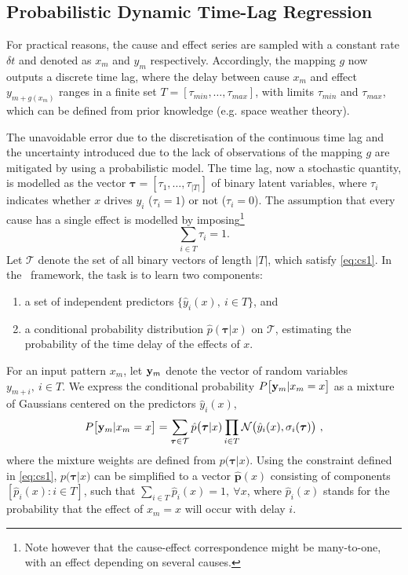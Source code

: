 \subsection{Probabilistic Dynamic Time-Lag Regression}

For practical reasons, the cause and effect series are sampled with a constant rate $\delta t$ and 
denoted as ${x_m}$ and ${y_m}$ respectively. Accordingly, the mapping $g$ now outputs a discrete 
time lag, where the delay between cause $x_m$ and effect $y_{m+g(x_m)}$ ranges in a finite set 
$T = [\tau_{min}, \ldots, \tau_{max}]$, with limits $\tau_{min}$ and  $\tau_{max}$, which can 
be defined from prior knowledge (e.g. space weather theory). 

The unavoidable error due to the discretisation of the continuous time lag and the uncertainty 
introduced due to the lack of observations of the mapping $g$ are mitigated by using a 
probabilistic model. The time lag, now a stochastic quantity, is modelled as the vector 
$\boldsymbol{\tau} = [\tau_1, \dots, \tau_{\rvert T \rvert}]$ of binary latent variables, 
where $\tau_i$ indicates whether $x$ drives $y_i$ ($\tau_i=1$) or not ($\tau_i=0$). The 
assumption that every cause has a single effect is modelled by imposing\footnote{Note however 
that the cause-effect correspondence might be many-to-one, with an effect depending on several 
causes.}
%
\begin{equation}\label{eq:cs1}
\sum_{i \in T} \tau_i = 1.
\end{equation}
%
Let $\mathcal{T}$ denote the set of all binary vectors of length $\rvert T \rvert$, which satisfy 
\cref{eq:cs1}. In the \XX \ framework, the task is to learn two components: 
\begin{enumerate}
  \item a set of independent predictors $\{\hat y_i(x),\ i \in T\}$, and
  \item a conditional probability distribution $\hat p(\boldsymbol{\tau} \rvert x)$ on 
        $\mathcal{T}$, estimating the probability of the time delay of the effects of $x$.
\end{enumerate} 
%
For an input pattern $x_m$, let ${\bf y}_m$ denote the vector of random variables 
$y_{m+i},\ i \in T$. We express the conditional probability $P\bigl[{\bf y}_{m}\vert x_m=x\bigr]$ 
as a mixture of Gaussians centered on the predictors $\hat y_i(x)$, 
%
\begin{equation}\label{eq:py}
  P\bigl[{\bf y}_{m}\vert x_m=x\bigr] = 
  \sum_{\boldsymbol{\tau}\in \mathcal{T}} \hat p\bigl(\boldsymbol{\tau}\vert x) 
  \prod_{i\in T} {\cal N}\bigl(\hat y_i(x),\sigma_i(\boldsymbol{\tau})\bigr) \ ,
\end{equation}
%
where the mixture weights are defined from $p\bigl(\boldsymbol{\tau}\vert x)$. Using the constraint 
defined in \cref{eq:cs1}, $p\bigl(\boldsymbol{\tau}\vert x)$ can be simplified to a vector 
$\hat{\mathbf{p}}(x)$ consisting of components $[\hat p_i(x): i \in T]$, such that 
$\sum_{i \in T}{\hat p_i(x)} = 1,\ \forall x$, where $\hat p_i(x)$ stands for the probability that 
the effect of $x_m=x$ will occur with delay $i$.

